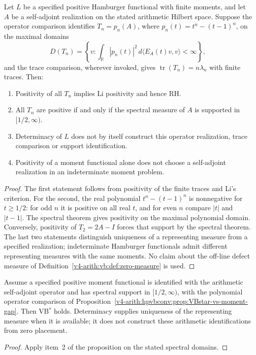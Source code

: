 \begin{proposition}
\label{v4-arith:hpvbconv:prop:VBstar-vs-moment-gap}
Let \(L\) be a specified positive Hamburger functional with finite
moments, and let \(A\) be a self-adjoint realization on the stated
arithmetic Hilbert space. Suppose the operator comparison identifies
\(T_n=p_n(A)\), where \(p_n(t)=t^n-(t-1)^n\), on the maximal domains
\[
 D(T_n)=\left\{v:\int_{\mathbb R}|p_n(t)|^2\,
 d\langle E_A(t)v,v\rangle<\infty\right\},
\]
and the trace
comparison, wherever invoked, gives \(\operatorname{tr}(T_n)=n\lambda_n\)
with finite traces. Then:
\begin{enumerate}
\item Positivity of all \(T_n\) implies Li positivity and hence RH.
\item All \(T_n\) are positive if and only if the spectral measure
of \(A\) is supported in \([1/2,\infty)\).
\item Determinacy of \(L\) does not by itself construct this operator
realization, trace comparison or support identification.
\item Positivity of a moment functional alone does not choose a
self-adjoint realization in an indeterminate moment problem.
\end{enumerate}
\end{proposition}
\begin{proof}
The first statement follows from positivity of the finite traces and
Li's criterion. For the second, the real polynomial
\(t^n-(t-1)^n\) is nonnegative for \(t\geq1/2\): for odd \(n\)
it is positive on all real \(t\), and for even \(n\) compare
\(|t|\) and \(|t-1|\). The spectral theorem gives positivity on
the maximal polynomial domain. Conversely, positivity of
\(T_2=2A-I\) forces that support by the spectral theorem. The
last two statements distinguish
uniqueness of a representing measure from a specified realization;
indeterminate Hamburger functionals admit different representing
measures with the same moments. No claim about the off-line defect
measure of Definition~\ref{v4-arith:vb:def:zero-measure} is used.
\end{proof}

\begin{corollary}
\label{v4-arith:hpvbconv:cor:missing-is-determinacy}
Assume a specified positive moment functional is identified with
the arithmetic self-adjoint operator and has spectral support in
\([1/2,\infty)\), with the polynomial operator comparison of
Proposition~\ref{v4-arith:hpvbconv:prop:VBstar-vs-moment-gap}.
Then VB\(^{*}\) holds. Determinacy supplies uniqueness of the
representing measure when it is available; it does not construct
these arithmetic identifications from zero placement.
\end{corollary}
\begin{proof}
Apply item~2 of the proposition on the stated spectral domains.
\end{proof}

